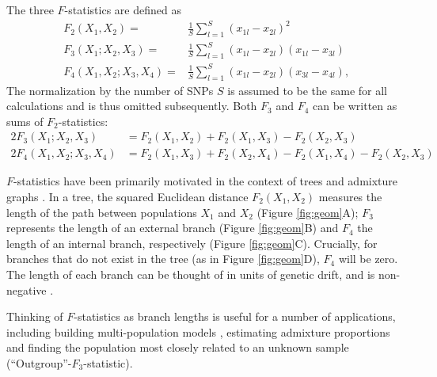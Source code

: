\documentclass[12pt,fullpage, a4paper]{article}
\begin{document}
The three $F$-statistics are defined as
\begin{subequations}
	\begin{align}
	F_2(X_1, X_2) =& \frac{1}{S}\sum_{l=1}^S(x_{1l} - x_{2l})^2
	\\
	F_3(X_1; X_2, X_3) =& \frac{1}{S}\sum_{l=1}^S(x_{1l} - x_{2l})(x_{1l} - x_{3l}) \\	
	F_4(X_1, X_2; X_3, X_4) =& \frac{1}{S}\sum_{l=1}^S(x_{1l} - x_{2l})(x_{3l} - x_{4l}) 	\text{,}
	\end{align}
\end{subequations}
The normalization by the number of SNPs $S$ is assumed to be the same for all calculations and is thus omitted subsequently. Both $F_3$ and $F_4$ can be written as sums of $F_2$-statistics:
\begin{subequations}
	\begin{align}
	2F_3(X_1; X_2, X_3) &=  F_2(X_1, X_2) + F_2(X_1, X_3) - F_2(X_2, X_3)\label{eq:f3fromf2}\\
	2F_4(X_1, X_2; X_3, X_4) &= F_2(X_1, X_3) + F_2(X_2, X_4) - F_2(X_1,X_4) - F_2(X_2, X_3)\label{eq:f4fromf2}
	\end{align}
\end{subequations}


$F$-statistics have been primarily motivated in the context of trees and admixture graphs \citep{patterson2012}. In a tree, the squared Euclidean distance $F_2(X_1, X_2)$ measures the length of the path between populations $X_1$ and $X_2$ (Figure \ref{fig:geom}A); $F_3$ represents the length of an external branch (Figure \ref{fig:geom}B) and $F_4$ the length of an internal branch, respectively (Figure \ref{fig:geom}C). Crucially, for branches that do not exist in the tree (as in Figure \ref{fig:geom}D), $F_4$ will be zero. The length of each branch can be thought of in units of genetic drift, and is non-negative \citep{patterson2012}. 
 
Thinking of $F$-statistics as branch lengths is useful for a number of applications, including building multi-population models \citep{patterson2012, lipson2013}, estimating admixture proportions \citep{petr2019, harney2021} and finding the population most closely related to an unknown sample (``Outgroup''-$F_3$-statistic).
\end{document}
